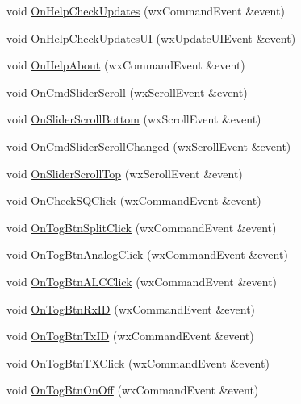 \begin{DoxyCompactItemize}
\item 
void \hyperlink{class_main_frame_ac7eac67418976a65c8fc98e12924042b}{On\-Help\-Check\-Updates} (wx\-Command\-Event \&event)
\item 
void \hyperlink{class_main_frame_ae82ea0e5f4f7299d52943ea6b85aa957}{On\-Help\-Check\-Updates\-U\-I} (wx\-Update\-U\-I\-Event \&event)
\item 
void \hyperlink{class_main_frame_a1761b6b588beed7b8965d9b0b2b561cc}{On\-Help\-About} (wx\-Command\-Event \&event)
\item 
void \hyperlink{class_main_frame_a844e8058f4e8869af084cb35643a0c6c}{On\-Cmd\-Slider\-Scroll} (wx\-Scroll\-Event \&event)
\item 
void \hyperlink{class_main_frame_aeda570594ad6ca298ade6b2dec5812c4}{On\-Slider\-Scroll\-Bottom} (wx\-Scroll\-Event \&event)
\item 
void \hyperlink{class_main_frame_a09fe6aa48627dd153964d44e9d80afa0}{On\-Cmd\-Slider\-Scroll\-Changed} (wx\-Scroll\-Event \&event)
\item 
void \hyperlink{class_main_frame_af7e0da6a850c5f08fd726280b7dc0af4}{On\-Slider\-Scroll\-Top} (wx\-Scroll\-Event \&event)
\item 
void \hyperlink{class_main_frame_a648c966a7d7ba7c86b0c404cb8f97361}{On\-Check\-S\-Q\-Click} (wx\-Command\-Event \&event)
\item 
void \hyperlink{class_main_frame_ad4c37f5ff0d7131df3450f8caab155d3}{On\-Tog\-Btn\-Split\-Click} (wx\-Command\-Event \&event)
\item 
void \hyperlink{class_main_frame_af237b0cdbd857d4cc72f5a523457eb82}{On\-Tog\-Btn\-Analog\-Click} (wx\-Command\-Event \&event)
\item 
void \hyperlink{class_main_frame_ab1371babf6ebc9e24211a3ada34ab666}{On\-Tog\-Btn\-A\-L\-C\-Click} (wx\-Command\-Event \&event)
\item 
void \hyperlink{class_main_frame_a242e28aff7e479e59afccfaffb8b8e85}{On\-Tog\-Btn\-Rx\-I\-D} (wx\-Command\-Event \&event)
\item 
void \hyperlink{class_main_frame_a2bcfb5c59829cca3136f4bbc3989cf79}{On\-Tog\-Btn\-Tx\-I\-D} (wx\-Command\-Event \&event)
\item 
void \hyperlink{class_main_frame_a4bb33d30636a8cad4693412bc25337b7}{On\-Tog\-Btn\-T\-X\-Click} (wx\-Command\-Event \&event)
\item 
void \hyperlink{class_main_frame_a7fc4afa20b92ac8e5f1ddfcf86820f28}{On\-Tog\-Btn\-On\-Off} (wx\-Command\-Event \&event)
\item 

\end{DoxyCompactItemize}

